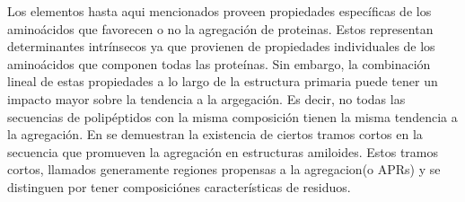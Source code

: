 

Los elementos hasta aqui mencionados proveen propiedades específicas de los aminoácidos que favorecen o no la agregación de proteinas.
Estos representan determinantes intrínsecos ya que provienen de propiedades individuales de los aminoácidos que componen todas las proteínas.
Sin embargo, la combinación lineal de estas propiedades a lo largo de la estructura primaria puede tener un impacto mayor sobre la tendencia a la argegación.
Es decir, no todas las secuencias de polipéptidos con la misma composición tienen la misma tendencia a la agregación.
En \cite{ventura2004short} se demuestran la existencia de ciertos tramos cortos en la secuencia que promueven la agregación en estructuras amiloides.
Estos tramos cortos, llamados generamente regiones propensas a la agregacion(o APRs) y se distinguen por tener composiciónes características de residuos.


